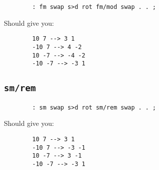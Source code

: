 \begin{lstlisting}
        : fm swap s>d rot fm/mod swap . . ; 
\end{lstlisting}

\noindent Should give you: 
\begin{lstlisting}
        10 7 --> 3 1
        -10 7 --> 4 -2 
        10 -7 --> -4 -2
        -10 -7 --> -3 1
\end{lstlisting}


\subsection{\texttt{sm/rem}}

\begin{lstlisting}
        : sm swap s>d rot sm/rem swap . . ; 
\end{lstlisting}

\noindent Should give you: 
\begin{lstlisting}
        10 7 --> 3 1
        -10 7 --> -3 -1 
        10 -7 --> 3 -1
        -10 -7 --> -3 1
\end{lstlisting}
